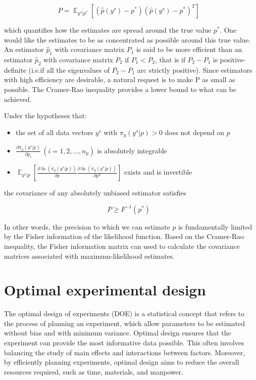 \documentclass[]{scrartcl}
\begin{document}
\begin{equation}
	P = \mathop{\mathbb{E}}_{y^s|p^*} \left[ \left( \hat{p}(y^s) - p^* \right) \left( \hat{p}(y^s) - p^* \right)^T \right]
\end{equation}

which quantifies how the estimates are spread around the true value $p^*$. One would like the estimates to be as concentrated as possible around this true value. An estimator $\hat{p}_1$ with covariance matrix $P_1$ is said to be more efficient than an estimator $\hat{p}_2$ with covariance matrix $P_2$ if $P_1 < P_2$, that is if $P_2 - P_1$ is positive-definite (i.e.if all the eigenvalues of $P_2-P_1$ arc strictly positive). Since estimators with high efficiency are desirable, a natural request is to make P as small as possible. The Cramer-Rao inequality provides a lower bound to what can be achieved.

Under the hypotheses that:

\begin{itemize}
	\item the set of all data vectors $y^s$ with $\pi_y(y^s|p) > 0$ does not depend on $p$
	\item $\frac{\partial \pi_y(y^s|p)}{\partial p_i}~\left(i=1,2,...,n_p\right)$ is absolutely integrable
	\item $\mathop{\mathbb{E}}_{y^s|p} \left[ \frac{\partial \ln (\pi_y (y^s|p))}{\partial p} \frac{\partial \ln (\pi_y (y^s|p))}{\partial p^T} \right]$ exists and is invertible
\end{itemize}

the covariance of any absolutely unbiased estimator satisfies

\begin{equation}
	P \geq F^{-1}(p^*)
\end{equation}

In other words, the precision to which we can estimate $p$ is fundamentally limited by the Fisher information of the likelihood function. Based on the Cramer-Rao inequality, the Fisher information matrix can used to calculate the covariance matrices associated with maximum-likelihood estimates.

\section{Optimal experimental design}

The optimal design of experiments (DOE) is a statistical concept that refers to the process of planning an experiment, which allow parameters to be estimated without bias and with minimum variance. Optimal design ensures that the experiment can provide the most informative data possible. This often involves balancing the study of main effects and interactions between factors. Moreover, by efficiently planning experiments, optimal design aims to reduce the overall resources required, such as time, materials, and manpower.
\end{document}
